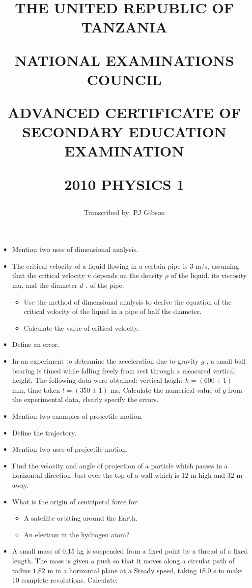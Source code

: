 \documentclass{article}
\title{THE UNITED REPUBLIC OF TANZANIA

NATIONAL EXAMINATIONS COUNCIL

ADVANCED CERTIFICATE OF SECONDARY EDUCATION EXAMINATION

\textbf{2010 PHYSICS 1}}
\author{Transcribed by:  PJ Gibson}
\begin{document}
\maketitle

\begin{itemize}
\item Mention two uses of dimensional analysis.
\item The critical velocity of a liquid flowing in a certain pipe is $ 3$ m$/$s, assuming that the critical velocity v depends on the density $ \rho $ of the liquid. its viscosity mu, and the diameter $ d$ . of the pipe. 
 \begin{itemize}
\item Use the method of dimensional analysis to derive the equation of the critical velocity of the liquid in a pipe of half the diameter.
\item Calculate the value of critical velocity.
\end{itemize}
\item Define an error.
\item In an experiment to determine the acceleration due to gravity $ g$ , a small ball bearing is timed while falling freely from rest through a measured vertical height. The following data were obtained: vertical height $ h=(600\pm 1)$ mm, time taken $ t=(350\pm 1)$ ms. Calculate the numerical value of $ g$ from the experimental data, clearly specify the errors. 
\item Mention two examples of projectile motion. 
\item Define the trajectory. 
\item Mention two uses of projectile motion.
\item Find the velocity and angle of projection of a particle which passes in a horizontal direction Just over the top of a wall which is $ 12$ m high and $ 32$ m away. 
\item What is the origin of centripetal force for:
 \begin{itemize}
\item A satellite orbiting around the Earth. 
\item An electron in the hydrogen atom?
\end{itemize}
\item A small mass of $ 0.15$ kg is suspended from a fixed point by a thread of a fixed length. The mass is given a push so that it moves along a circular path of radius $ 1.82$ m in a horizontal plane at a Steady speed, taking $ 18.0$ s to make $ 10$ complete revolutions. Calculate:

\end{itemize}
\end{document}

